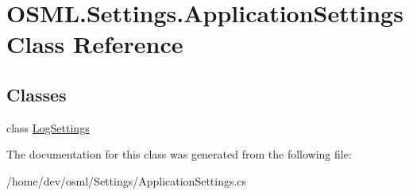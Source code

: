 \hypertarget{classOSML_1_1Settings_1_1ApplicationSettings}{}\section{O\+S\+M\+L.\+Settings.\+Application\+Settings Class Reference}
\label{classOSML_1_1Settings_1_1ApplicationSettings}
\subsection*{Classes}
\begin{DoxyCompactItemize}
\item 
class \mbox{\hyperlink{classOSML_1_1Settings_1_1ApplicationSettings_1_1LogSettings}{Log\+Settings}}
\end{DoxyCompactItemize}


The documentation for this class was generated from the following file\+:\begin{DoxyCompactItemize}
\item 
/home/dev/osml/\+Settings/Application\+Settings.\+cs\end{DoxyCompactItemize}
